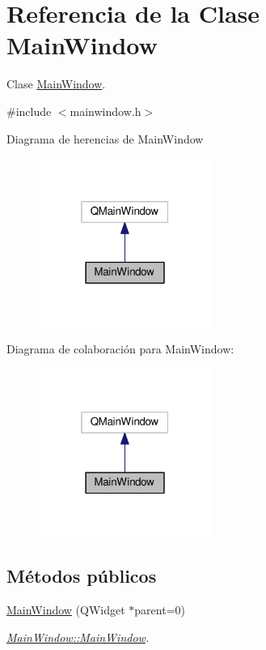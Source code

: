 \hypertarget{class_main_window}{}\section{Referencia de la Clase Main\+Window}
\label{class_main_window}


Clase \hyperlink{class_main_window}{Main\+Window}.  




{\ttfamily \#include $<$mainwindow.\+h$>$}



Diagrama de herencias de Main\+Window\nopagebreak
\begin{figure}[H]
\begin{center}
\leavevmode
\includegraphics[width=160pt]{class_main_window__inherit__graph}
\end{center}
\end{figure}


Diagrama de colaboración para Main\+Window\+:\nopagebreak
\begin{figure}[H]
\begin{center}
\leavevmode
\includegraphics[width=160pt]{class_main_window__coll__graph}
\end{center}
\end{figure}
\subsection*{Métodos públicos}
\begin{DoxyCompactItemize}
\item 
\hyperlink{class_main_window_a8b244be8b7b7db1b08de2a2acb9409db}{Main\+Window} (Q\+Widget $\ast$parent=0)
\begin{DoxyCompactList}\small\item\em \hyperlink{class_main_window_a8b244be8b7b7db1b08de2a2acb9409db}{Main\+Window\+::\+Main\+Window}. \end{DoxyCompactList}\end{DoxyCompactItemize}


